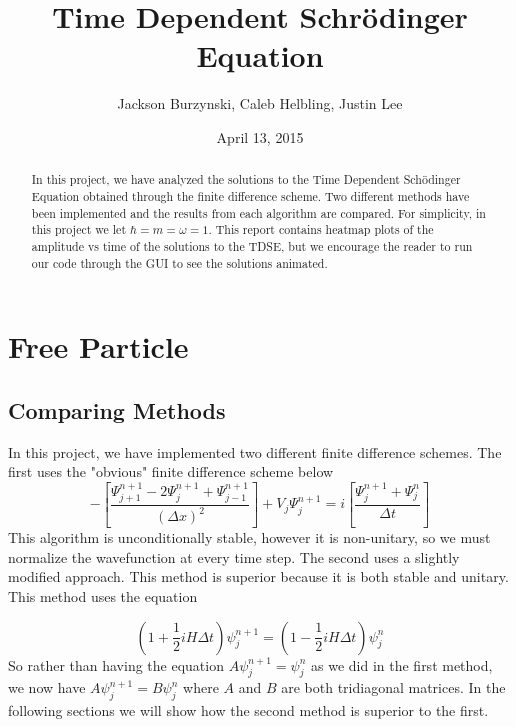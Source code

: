 \documentclass{article}
\begin{document}
\title{Time Dependent Schr\"{o}dinger Equation}
\author{Jackson Burzynski, Caleb Helbling, Justin Lee}
\date{April 13, 2015}

\maketitle

\begin{abstract}

In this project, we have analyzed the solutions to the Time Dependent Sch\"{o}dinger Equation obtained through the finite difference scheme. Two different methods have been implemented and the results from each algorithm are compared. For simplicity, in this project we let $\hbar = m = \omega = 1$. This report contains heatmap plots of the amplitude vs time of the solutions to the TDSE, but we encourage the reader to run our code through the GUI to see the solutions animated.

\end{abstract}

\section{Free Particle}

\subsection{Comparing Methods}

In this project, we have implemented two different finite difference schemes. The first uses the "obvious" finite difference scheme below
\begin{equation}
-\left[ \frac{\Psi_{j+1}^{n+1} -2 \Psi_j^{n+1} + \Psi_{j-1}^{n+1}}{(\Delta x)^2} \right] + V_j \Psi_j^{n+1} = i \left[ \frac{\Psi_j^{n+1} + \Psi_j^n}{\Delta t} \right]
\end{equation}
%
This algorithm is unconditionally stable, however it is non-unitary, so we must normalize the wavefunction at every time step. The second uses a slightly modified approach. This method is superior because it is both stable and unitary. This method uses the equation

\begin{equation}
(1+\frac{1}{2}iH\Delta t)\psi_j^{n+1} = (1-\frac{1}{2}iH\Delta t)\psi_j^n
\end{equation}
%
So rather than having the equation $A\psi_j^{n+1} = \psi_j^n$ as we did in the first method, we now have $A\psi_j^{n+1} = B\psi_j^n$ where $A$ and $B$ are both tridiagonal matrices. In the following sections we will show how the second method is superior to the first.
\end{document}
